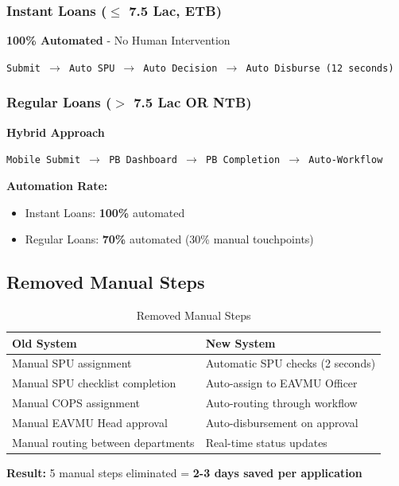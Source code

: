 \documentclass[12pt,a4paper]{article}
\begin{document}
\subsubsection{Instant Loans ($\leq$ 7.5 Lac, ETB)}
\textbf{100\% Automated} - No Human Intervention

\texttt{Submit $\rightarrow$ Auto SPU $\rightarrow$ Auto Decision $\rightarrow$ Auto Disburse (12 seconds)}

\subsubsection{Regular Loans ($>$ 7.5 Lac OR NTB)}
\textbf{Hybrid Approach}

\texttt{Mobile Submit $\rightarrow$ PB Dashboard $\rightarrow$ PB Completion $\rightarrow$ Auto-Workflow}

\textbf{Automation Rate:}
\begin{itemize}
    \item Instant Loans: \textbf{100\%} automated
    \item Regular Loans: \textbf{70\%} automated (30\% manual touchpoints)
\end{itemize}

\subsection{Removed Manual Steps}

\begin{table}[h]
\centering
\begin{tabular}{@{}ll@{}}
\toprule
\textbf{Old System} & \textbf{New System} \\ \midrule
Manual SPU assignment & Automatic SPU checks (2 seconds) \\
Manual SPU checklist completion & Auto-assign to EAVMU Officer \\
Manual COPS assignment & Auto-routing through workflow \\
Manual EAVMU Head approval & Auto-disbursement on approval \\
Manual routing between departments & Real-time status updates \\ \bottomrule
\end{tabular}
\caption{Removed Manual Steps}
\end{table}

\textbf{Result:} 5 manual steps eliminated = \textbf{2-3 days saved per application}

\newpage
\end{document}
